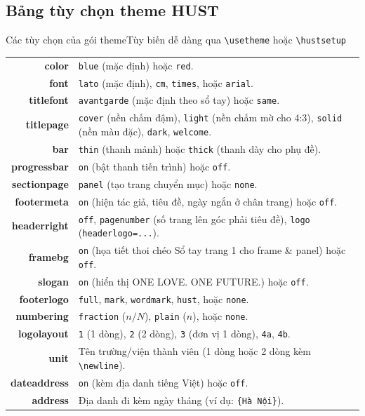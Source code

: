 \documentclass[aspectratio=169,10pt]{beamer}
\begin{document}
\subsection{Bảng tùy chọn theme HUST}
\begin{frame}{Các tùy chọn của gói theme}{Tùy biến dễ dàng qua \texttt{\textbackslash usetheme} hoặc \texttt{\textbackslash hustsetup}}
  \scriptsize
  \centering
  \begin{tabularx}{\textwidth}{>{\ttfamily\bfseries\color{hustmain}}r >{\small}X}
    color       & \texttt{blue} (mặc định) hoặc \texttt{red}. \\
    font        & \texttt{lato} (mặc định), \texttt{cm}, \texttt{times}, hoặc \texttt{arial}. \\
    titlefont   & \texttt{avantgarde} (mặc định theo sổ tay) hoặc \texttt{same}. \\
    titlepage   & \texttt{cover} (nền chấm đậm), \texttt{light} (nền chấm mờ cho 4:3), \texttt{solid} (nền màu đặc), \texttt{dark}, \texttt{welcome}. \\
    bar         & \texttt{thin} (thanh mảnh) hoặc \texttt{thick} (thanh dày cho phụ đề). \\
    progressbar & \texttt{on} (bật thanh tiến trình) hoặc \texttt{off}. \\
    sectionpage & \texttt{panel} (tạo trang chuyển mục) hoặc \texttt{none}. \\
    footermeta  & \texttt{on} (hiện tác giả, tiêu đề, ngày ngắn ở chân trang) hoặc \texttt{off}. \\
    headerright & \texttt{off}, \texttt{pagenumber} (số trang lên góc phải tiêu đề), \texttt{logo} (\texttt{headerlogo=...}). \\
    framebg     & \texttt{on} (họa tiết thoi chéo Sổ tay trang 1 cho frame \& panel) hoặc \texttt{off}. \\
    slogan      & \texttt{on} (hiển thị ONE LOVE. ONE FUTURE.) hoặc \texttt{off}. \\
    footerlogo  & \texttt{full}, \texttt{mark}, \texttt{wordmark}, \texttt{hust}, hoặc \texttt{none}. \\
    numbering   & \texttt{fraction} ($n/N$), \texttt{plain} ($n$), hoặc \texttt{none}. \\
    logolayout  & \texttt{1} (1 dòng), \texttt{2} (2 dòng), \texttt{3} (đơn vị 1 dòng), \texttt{4a}, \texttt{4b}. \\
    unit        & Tên trường/viện thành viên (1 dòng hoặc 2 dòng kèm \texttt{\textbackslash newline}). \\
    dateaddress & \texttt{on} (kèm địa danh tiếng Việt) hoặc \texttt{off}. \\
    address     & Địa danh đi kèm ngày tháng (ví dụ: \texttt{\{Hà Nội\}}). \\
  \end{tabularx}
\end{frame}
\end{document}
